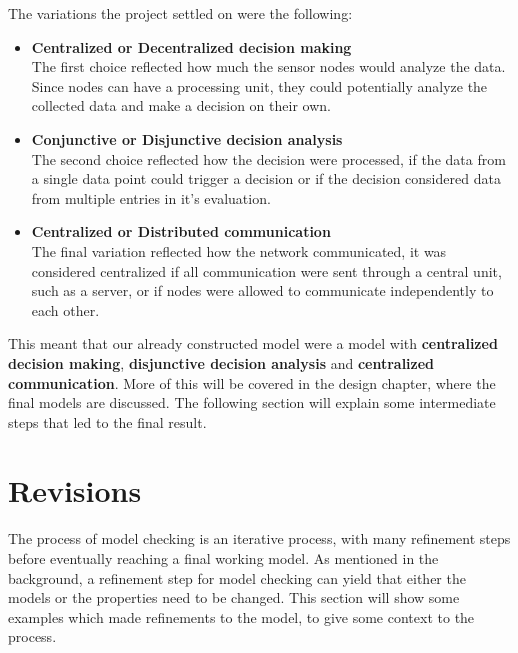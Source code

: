 The variations the project settled on were the following:

\begin{itemize}
\item[] \textbf{Centralized or Decentralized decision making} \\ The first choice reflected how much the sensor nodes would analyze the data. Since nodes can have a processing unit, they could potentially analyze the collected data and make a decision on their own.
\item[] \textbf{Conjunctive or Disjunctive decision analysis} \\ The second choice reflected how the decision were processed, if the data from a single data point could trigger a decision or if the decision considered data from multiple entries in it's evaluation.
\item[] \textbf{Centralized or Distributed communication} \\ The final variation reflected how the network communicated, it was considered centralized if all communication were sent through a central unit, such as a server, or if nodes were allowed to communicate independently to each other. 
\end{itemize}




This meant that our already constructed model were a model with \textbf{centralized decision making}, \textbf{disjunctive decision analysis} and \textbf{centralized communication}. More of this will be covered in the design chapter, where the final models are discussed. The following section will explain some intermediate steps that led to the final result.

\section{Revisions}

The process of model checking is an iterative process, with many refinement steps before eventually reaching a final working model. As mentioned in the background, a refinement step for model checking can yield that either the models or the properties need to be changed. This section will show some examples which made refinements to the model, to give some context to the process. \\

